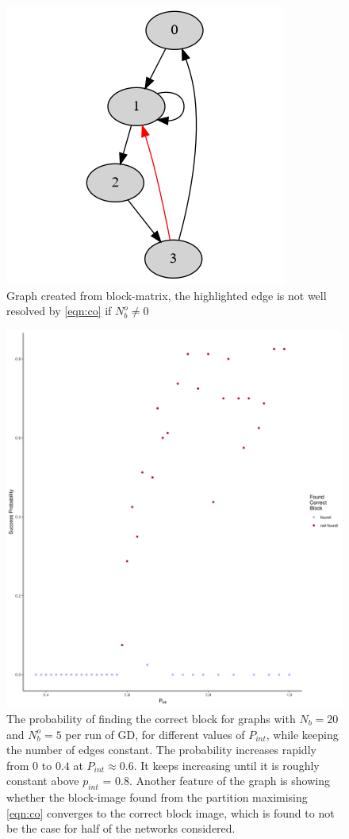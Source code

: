 \documentclass[9pt,twocolumn,twoside,lineno]{pnas-new}
\begin{document}
\begin{figure}%
\centering
\includegraphics[width=.8\linewidth]{figures/GD_block}
\caption{Graph created from block-matrix, the highlighted edge is not well resolved by \ref{eqn:co} if $N_b^o \neq 0$}
\label{fig:GD_block}
\end{figure}

\begin{figure}%
\centering
\includegraphics[width=.9\linewidth]{figures/GD_prob_fill}
\caption{The probability of finding the correct block for graphs with $N_b = 20$ and $N_b^o = 5$ per run of GD, for different values of $P_{int}$, while keeping the number of edges constant. The probability increases rapidly from $0$ to $0.4$ at $P_{int} \approx 0.6$. It keeps increasing until it is roughly constant above $p_{int}$ = 0.8. Another feature of the graph is showing whether the block-image found from the partition maximising \ref{eqn:co} converges to the correct block image, which is found to not be the case for half of the networks considered. }
\label{fig:GD_random_fill}
\end{figure}
\end{document}
